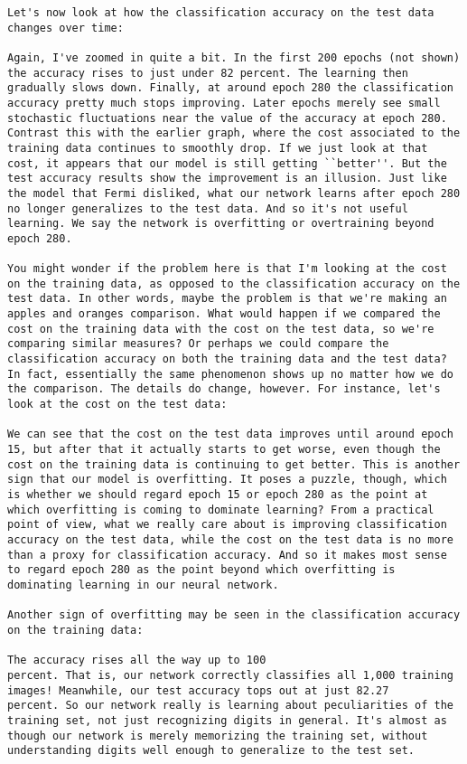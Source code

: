 \begin{lstlisting}
Let's now look at how the classification accuracy on the test data changes over time:

Again, I've zoomed in quite a bit. In the first 200 epochs (not shown) the accuracy rises to just under 82 percent. The learning then gradually slows down. Finally, at around epoch 280 the classification accuracy pretty much stops improving. Later epochs merely see small stochastic fluctuations near the value of the accuracy at epoch 280. Contrast this with the earlier graph, where the cost associated to the training data continues to smoothly drop. If we just look at that cost, it appears that our model is still getting ``better''. But the test accuracy results show the improvement is an illusion. Just like the model that Fermi disliked, what our network learns after epoch 280 no longer generalizes to the test data. And so it's not useful learning. We say the network is overfitting or overtraining beyond epoch 280.

You might wonder if the problem here is that I'm looking at the cost on the training data, as opposed to the classification accuracy on the test data. In other words, maybe the problem is that we're making an apples and oranges comparison. What would happen if we compared the cost on the training data with the cost on the test data, so we're comparing similar measures? Or perhaps we could compare the classification accuracy on both the training data and the test data? In fact, essentially the same phenomenon shows up no matter how we do the comparison. The details do change, however. For instance, let's look at the cost on the test data:

We can see that the cost on the test data improves until around epoch 15, but after that it actually starts to get worse, even though the cost on the training data is continuing to get better. This is another sign that our model is overfitting. It poses a puzzle, though, which is whether we should regard epoch 15 or epoch 280 as the point at which overfitting is coming to dominate learning? From a practical point of view, what we really care about is improving classification accuracy on the test data, while the cost on the test data is no more than a proxy for classification accuracy. And so it makes most sense to regard epoch 280 as the point beyond which overfitting is dominating learning in our neural network.

Another sign of overfitting may be seen in the classification accuracy on the training data:

The accuracy rises all the way up to 100
percent. That is, our network correctly classifies all 1,000 training images! Meanwhile, our test accuracy tops out at just 82.27
percent. So our network really is learning about peculiarities of the training set, not just recognizing digits in general. It's almost as though our network is merely memorizing the training set, without understanding digits well enough to generalize to the test set.


\end{lstlisting}
